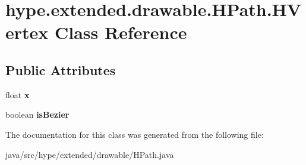 \hypertarget{classhype_1_1extended_1_1drawable_1_1_h_path_1_1_h_vertex}{\section{hype.\-extended.\-drawable.\-H\-Path.\-H\-Vertex Class Reference}
\label{classhype_1_1extended_1_1drawable_1_1_h_path_1_1_h_vertex}
}
\subsection*{Public Attributes}
\begin{DoxyCompactItemize}
\item 
\hypertarget{classhype_1_1extended_1_1drawable_1_1_h_path_1_1_h_vertex_a4507e989e25426fff74500b1909b4458}{float {\bfseries x}}\label{classhype_1_1extended_1_1drawable_1_1_h_path_1_1_h_vertex_a4507e989e25426fff74500b1909b4458}

\item 
\hypertarget{classhype_1_1extended_1_1drawable_1_1_h_path_1_1_h_vertex_afdd31a02ce232e9419b28df652d706f8}{boolean {\bfseries is\-Bezier}}\label{classhype_1_1extended_1_1drawable_1_1_h_path_1_1_h_vertex_afdd31a02ce232e9419b28df652d706f8}

\end{DoxyCompactItemize}


The documentation for this class was generated from the following file\-:\begin{DoxyCompactItemize}
\item 
java/src/hype/extended/drawable/H\-Path.\-java\end{DoxyCompactItemize}
